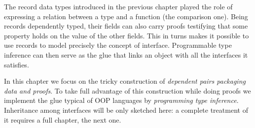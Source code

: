 The record data types introduced in the previous chapter played the
role of expressing a relation between a type and a function (the
comparison one).  Being records dependently typed, their fields can
also carry proofs testifying that some property holds on the value of
the other fields.  This in turns makes it possible to use records to
model precisely the concept of interface.  Programmable type inference
can then serve as the glue that links an object with all the
interfaces it satisfies.

In this chapter we focus on the tricky construction of
\emph{dependent pairs packaging data and proofs}.  To take
full advantage of this construction while doing proofs we
implement the glue typical of OOP languages by \emph{programming
type inference}.
Inheritance among interfaces will be only sketched here: a complete
treatment of it requires a full chapter, the next one.

\mcbNOTES{}

%
%
%
%


